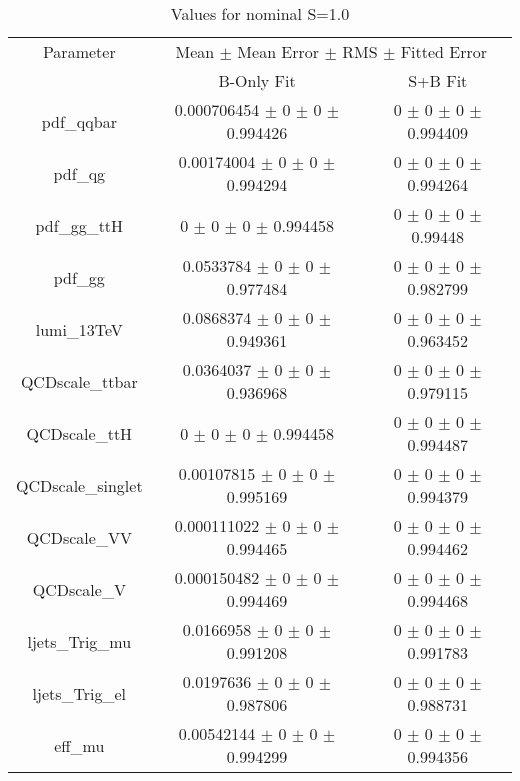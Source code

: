 \begin{table}
\centering
\caption{Values for nominal S=1.0}
\begin{tabular}{ccc}
\toprule
Parameter 	& \multicolumn{2}{c}{Mean $\pm$ Mean Error $\pm$ RMS $\pm$ Fitted Error}\\
 	& B-Only Fit & S+B Fit\\
\midrule
pdf\_qqbar 	& \num{0.000706454} $\pm$ \num{0} $\pm$ \num{0} $\pm$ \num{0.994426} 	& \num{0} $\pm$ \num{0} $\pm$ \num{0} $\pm$ \num{0.994409}\\
pdf\_qg 	& \num{0.00174004} $\pm$ \num{0} $\pm$ \num{0} $\pm$ \num{0.994294} 	& \num{0} $\pm$ \num{0} $\pm$ \num{0} $\pm$ \num{0.994264}\\
pdf\_gg\_ttH 	& \num{0} $\pm$ \num{0} $\pm$ \num{0} $\pm$ \num{0.994458} 	& \num{0} $\pm$ \num{0} $\pm$ \num{0} $\pm$ \num{0.99448}\\
pdf\_gg 	& \num{0.0533784} $\pm$ \num{0} $\pm$ \num{0} $\pm$ \num{0.977484} 	& \num{0} $\pm$ \num{0} $\pm$ \num{0} $\pm$ \num{0.982799}\\
lumi\_13TeV 	& \num{0.0868374} $\pm$ \num{0} $\pm$ \num{0} $\pm$ \num{0.949361} 	& \num{0} $\pm$ \num{0} $\pm$ \num{0} $\pm$ \num{0.963452}\\
QCDscale\_ttbar 	& \num{0.0364037} $\pm$ \num{0} $\pm$ \num{0} $\pm$ \num{0.936968} 	& \num{0} $\pm$ \num{0} $\pm$ \num{0} $\pm$ \num{0.979115}\\
QCDscale\_ttH 	& \num{0} $\pm$ \num{0} $\pm$ \num{0} $\pm$ \num{0.994458} 	& \num{0} $\pm$ \num{0} $\pm$ \num{0} $\pm$ \num{0.994487}\\
QCDscale\_singlet 	& \num{0.00107815} $\pm$ \num{0} $\pm$ \num{0} $\pm$ \num{0.995169} 	& \num{0} $\pm$ \num{0} $\pm$ \num{0} $\pm$ \num{0.994379}\\
QCDscale\_VV 	& \num{0.000111022} $\pm$ \num{0} $\pm$ \num{0} $\pm$ \num{0.994465} 	& \num{0} $\pm$ \num{0} $\pm$ \num{0} $\pm$ \num{0.994462}\\
QCDscale\_V 	& \num{0.000150482} $\pm$ \num{0} $\pm$ \num{0} $\pm$ \num{0.994469} 	& \num{0} $\pm$ \num{0} $\pm$ \num{0} $\pm$ \num{0.994468}\\
ljets\_Trig\_mu 	& \num{0.0166958} $\pm$ \num{0} $\pm$ \num{0} $\pm$ \num{0.991208} 	& \num{0} $\pm$ \num{0} $\pm$ \num{0} $\pm$ \num{0.991783}\\
ljets\_Trig\_el 	& \num{0.0197636} $\pm$ \num{0} $\pm$ \num{0} $\pm$ \num{0.987806} 	& \num{0} $\pm$ \num{0} $\pm$ \num{0} $\pm$ \num{0.988731}\\
eff\_mu 	& \num{0.00542144} $\pm$ \num{0} $\pm$ \num{0} $\pm$ \num{0.994299} 	& \num{0} $\pm$ \num{0} $\pm$ \num{0} $\pm$ \num{0.994356}\\

\end{tabular}
\end{table}

